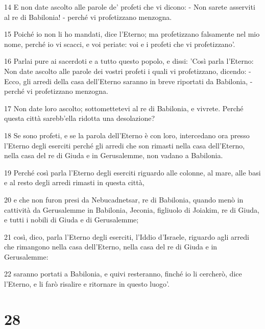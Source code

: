 \par 14 E non date ascolto alle parole de' profeti che vi dicono: - Non sarete asserviti al re di Babilonia! - perché vi profetizzano menzogna.
\par 15 Poiché io non li ho mandati, dice l'Eterno; ma profetizzano falsamente nel mio nome, perché io vi scacci, e voi periate: voi e i profeti che vi profetizzano'.
\par 16 Parlai pure ai sacerdoti e a tutto questo popolo, e dissi: 'Così parla l'Eterno: Non date ascolto alle parole dei vostri profeti i quali vi profetizzano, dicendo: - Ecco, gli arredi della casa dell'Eterno saranno in breve riportati da Babilonia, - perché vi profetizzano menzogna.
\par 17 Non date loro ascolto; sottomettetevi al re di Babilonia, e vivrete. Perché questa città sarebb'ella ridotta una desolazione?
\par 18 Se sono profeti, e se la parola dell'Eterno è con loro, intercedano ora presso l'Eterno degli eserciti perché gli arredi che son rimasti nella casa dell'Eterno, nella casa del re di Giuda e in Gerusalemme, non vadano a Babilonia.
\par 19 Perché così parla l'Eterno degli eserciti riguardo alle colonne, al mare, alle basi e al resto degli arredi rimasti in questa città,
\par 20 e che non furon presi da Nebucadnetsar, re di Babilonia, quando menò in cattività da Gerusalemme in Babilonia, Jeconia, figliuolo di Joiakim, re di Giuda, e tutti i nobili di Giuda e di Gerusalemme;
\par 21 così, dico, parla l'Eterno degli eserciti, l'Iddio d'Israele, riguardo agli arredi che rimangono nella casa dell'Eterno, nella casa del re di Giuda e in Gerusalemme:
\par 22 saranno portati a Babilonia, e quivi resteranno, finché io li cercherò, dice l'Eterno, e li farò risalire e ritornare in questo luogo'.

\chapter{28}

